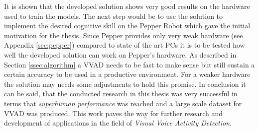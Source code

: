 It is shown that the developed solution shows very good results on the hardware used to train the models.
The next step would be to use the solution to implement the desired cognitive skill on the Pepper Robot which gave the initial motivation for the thesis. 
Since Pepper provides only very weak hardware (see Appendix \ref{sec:pepper}) compared to state of the art PCs it is to be tested how well the developed solution can work on Pepper's hardware.
As described in Section \ref{ssec:algorithm} a VVAD needs to be fast to make sense but still sustain a certain accuracy to be used in a productive environment.
For a weaker hardware the solution may needs some adjustments to hold this promise.
In conclusion it can be said, that the conducted research in this thesis was very successful in terms that \emph{superhuman performance} was reached and a large scale dataset  for  VVAD was produced.
This work paves the way for further research and development of applications in the field of \emph{Visual Voice Activity Detection}.
